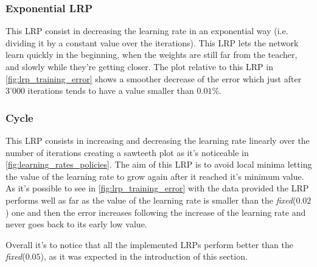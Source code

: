 \subsubsection{Exponential LRP}
This LRP consist in decreasing the learning rate in an exponential way (i.e. dividing it by a constant value over the iterations). This
LRP lets the network learn quickly in the beginning, when the weights are still far from the teacher, and slowly while they're getting closer. The plot
relative to this LRP in \cref{fig:lrp_training_error} shows a smoother decrease of the error which just after 3'000 iterations tends to have a value
smaller than $0.01\%$.

\subsubsection{Cycle}
This LRP consists in increasing and decreasing the learning rate linearly over the number of iterations creating a sawteeth plot as it's noticeable
in \cref{fig:learning_rates_policies}. The aim of this LRP is to avoid local minima letting the value of the learning rate to grow again after it
reached it's minimum value. As it's possible to see in \cref{fig:lrp_training_error} with the data provided the LRP performs well as far
as the value of the learning rate is smaller than the \textit{fixed}($0.02$) one and then the error increases following the increase of the learning rate and never
goes back to its early low value.

Overall it's to notice that all the implemented LRPs perform better than the \textit{fixed}($0.05$), as it was expected in the introduction of this section.